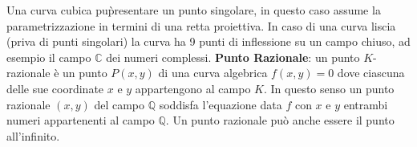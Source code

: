 \documentclass[a4paper,12pt]{tesiinfo}
\begin{document}
\newline
Una curva cubica pu\` presentare un punto singolare, in questo caso assume la parametrizzazione in termini di una retta proiettiva. In caso di una curva liscia (priva di punti singolari) la curva ha 9 punti di inflessione su un campo chiuso, ad esempio il campo $\mathbb{C}$ dei numeri complessi. 
\newline\newline
%
%
%
\textbf{Punto Razionale}: un punto $K$-razionale \`e un punto $P(x, y)$ di una curva algebrica $f(x, y)=0$ dove ciascuna delle sue coordinate $x$ e $y$ appartengono al campo $K$. In questo senso un punto razionale $(x, y)$ del campo $\mathbb{Q}$ soddisfa l'equazione data $f$ con $x$ e $y$ entrambi numeri appartenenti al campo $\mathbb{Q}$. 
\newline
Un punto razionale pu\`o anche essere il punto all'infinito.
\newline\newline
%
%
%
\newline\newline
%
%
%
%
%
%
%
%
%
%
%
%
%
\end{document}
